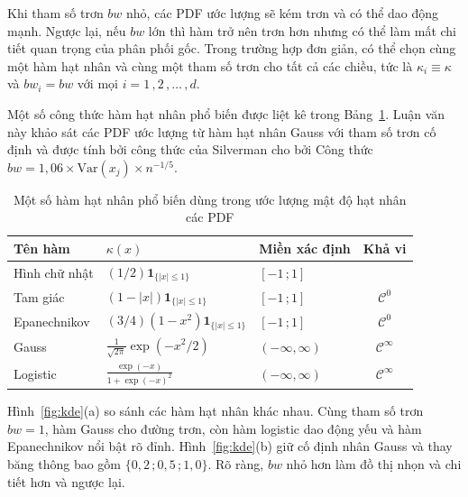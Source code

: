 \documentclass[a4paper,oneside]{book} %
\theoremstyle{plain}
\theoremstyle{plain}
\theoremstyle{nonumberplain}
\newcommand{\chy}[1]{\begin{remark}#1\end{remark}}
\begin{document}
\chy{Khi tham số trơn $bw$ nhỏ, các PDF ước lượng sẽ kém trơn và có thể dao động mạnh. Ngược lại, nếu $bw$ lớn thì hàm trở nên trơn hơn nhưng có thể làm mất chi tiết quan trọng của phân phối gốc. Trong trường hợp đơn giản, có thể chọn cùng một hàm hạt nhân và cùng một tham số trơn cho tất cả các chiều, tức là $\kappa_i \equiv \kappa$ và ${bw}_i = {bw}$ với mọi $i=1\,,2\,,\ldots\,,d$. }
	
	Một số công thức hàm hạt nhân phổ biến được liệt kê trong Bảng~\ref{tab:kernel}. Luận văn này khảo sát  các PDF ước lượng từ hàm hạt nhân Gauss với tham số trơn cố định và được tính bởi công thức của Silverman cho bởi Công thức $bw = 1{,}06 \times \mathrm{Var}(x_j) \times n^{-1/5}$.


\begin{table}
	\centering
	\caption{Một số hàm hạt nhân phổ biến dùng trong ước lượng mật độ hạt nhân các PDF}
	\label{tab:kernel}
	\centering\fontsize{11pt}{14pt}\selectfont
\begin{tabular*}{\columnwidth}{@{\extracolsep\fill}lllc@{\extracolsep\fill}} 
		\toprule
		\textbf{Tên hàm} & \textbf{$\kappa(x)$} & \textbf{Miền xác định} & \textbf{Khả vi}\\\midrule
		Hình chữ nhật &
		$ (1/2)\bm1_{\{|x| \leq 1\}}$ &
		$[-1\,; 1]$ &  \\
		Tam giác &
		$ (1 - |x|) \bm1_{\{|x| \leq 1\}}$ &
		$[-1\,; 1]$ & $\mathcal{C}^0$ \\
		Epanechnikov &
		$ (3/4)(1 - x^2) \bm1_{\{|x| \leq 1\}}$ &
		$[-1\,; 1]$ &  $\mathcal{C}^0$ \\
		Gauss &
		$ \frac{1}{\sqrt{2\pi}} \exp\left(-x^2/2\right)$ &
	$(-\infty,\infty)$ &  $\mathcal{C}^\infty$  \\
		Logistic &
		$\frac{\exp(-x)}{1 + \exp(-x)^2}$ &
		$(-\infty,\infty)$ & $\mathcal{C}^\infty$\\
		\bottomrule
	\end{tabular*}
\end{table}

Hình~\ref{fig:kde}(a) so sánh các hàm hạt nhân khác nhau. Cùng tham số trơn $bw=1$, hàm Gauss cho đường trơn, còn hàm logistic dao động yếu và hàm Epanechnikov nổi bật rõ đỉnh. Hình~\ref{fig:kde}(b) giữ cố định nhân Gauss và thay băng thông bao gồm $\{0{,}2\,;0{,}5\,;1{,}0\}$. Rõ ràng, $bw$ nhỏ hơn làm đồ thị nhọn và chi tiết hơn và ngược lại.
\end{document}
